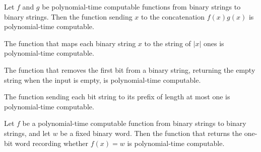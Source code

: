 \begin{lemma}
\label{Complexity.sat_pt_append}
\leanok
{}
Let $f$ and $g$ be polynomial-time computable functions from binary strings to binary
strings. Then the function sending $x$ to the concatenation $f(x)g(x)$ is
polynomial-time computable.
\end{lemma}

\begin{lemma}
\label{Complexity.sat_pt_unaryLength}
\leanok
{}
The function that maps each binary string $x$ to the string of $|x|$ ones is
polynomial-time computable.
\end{lemma}

\begin{lemma}
\label{Complexity.sat_pt_tail}
\leanok
{}
The function that removes the first bit from a binary string, returning the empty string
when the input is empty, is polynomial-time computable.
\end{lemma}

\begin{lemma}
\label{Complexity.sat_pt_head}
\leanok
{}
The function sending each bit string to its prefix of length at most one is
polynomial-time computable.
\end{lemma}

\begin{lemma}
\label{Complexity.sat_pt_eq}
\leanok
{}
Let $f$ be a polynomial-time computable function from binary strings to binary strings,
and let $w$ be a fixed binary word. Then the function that returns the one-bit word
recording whether $f(x)=w$ is polynomial-time computable.
\end{lemma}

